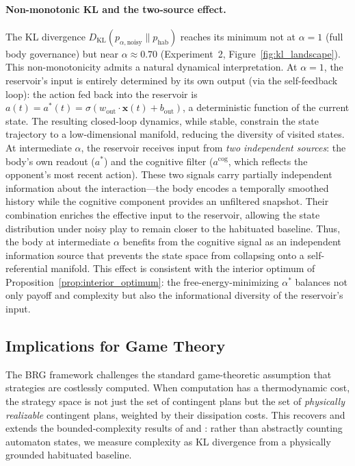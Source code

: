 \documentclass[11pt,a4paper]{article}
\theoremstyle{definition}
\newcommand{\KL}{D_{\mathrm{KL}}}
\newcommand{\Wout}{w_{\mathrm{out}}}
\newcommand{\xstate}{\mathbf{x}}
\newcommand{\acog}{a^{\mathrm{cog}}}
\newcommand{\abody}{a^{*}}
\newcommand{\bout}{b_{\mathrm{out}}}
\begin{document}
\paragraph{Non-monotonic KL and the two-source effect.}
\label{sec:two_source}
The KL divergence $\KL(p_{\alpha,\mathrm{noisy}} \| p_{\mathrm{hab}})$
reaches its minimum not at $\alpha = 1$ (full body governance) but near
$\alpha \approx 0.70$ (Experiment~2, Figure~\ref{fig:kl_landscape}).
This non-monotonicity admits a natural dynamical interpretation.
At $\alpha = 1$, the reservoir's input is entirely determined by its own
output (via the self-feedback loop): the action fed back into the reservoir
is $a(t) = \abody(t) = \sigma(\Wout \cdot \xstate(t) + \bout)$, a
deterministic function of the current state.  The resulting closed-loop
dynamics, while stable, constrain the state trajectory to a low-dimensional
manifold, reducing the diversity of visited states.
At intermediate $\alpha$, the reservoir receives input from \emph{two
independent sources}: the body's own readout ($\abody$) and the cognitive
filter ($\acog$, which reflects the opponent's most recent action).
These two signals carry partially independent information about the
interaction---the body encodes a temporally smoothed history while the
cognitive component provides an unfiltered snapshot.  Their combination
enriches the effective input to the reservoir, allowing the state
distribution under noisy play to remain closer to the habituated baseline.
Thus, the body at intermediate $\alpha$ benefits from the cognitive
signal as an independent information source that prevents the state space
from collapsing onto a self-referential manifold.  This effect is
consistent with the interior optimum of
Proposition~\ref{prop:interior_optimum}: the free-energy-minimizing
$\alpha^{*}$ balances not only payoff and complexity but also the
informational diversity of the reservoir's input.

\subsection{Implications for Game Theory}

The BRG framework challenges the standard game-theoretic assumption that
strategies are costlessly computed.  When computation has a thermodynamic
cost, the strategy space is not just the set of contingent plans but the
set of \emph{physically realizable} contingent plans, weighted by their
dissipation costs.  This recovers and extends the bounded-complexity
results of \citet{rubinstein1986} and \citet{abreurubinstein1988}: rather
than abstractly counting automaton states, we measure complexity as KL
divergence from a physically grounded habituated baseline.
\end{document}
